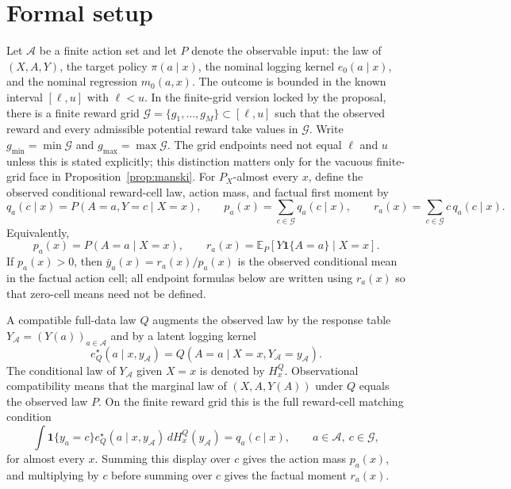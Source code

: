\documentclass[11pt]{article}
\newcommand{\E}{\mathbb{E}}
\newcommand{\one}{\mathbf{1}}
\theoremstyle{definition}
\theoremstyle{plain}
\theoremstyle{remark}
\begin{document}
\section{Formal setup}
Let $\mathcal A$ be a finite action set and let $P$ denote the observable input:
the law of $(X,A,Y)$, the target policy $\pi(a\mid x)$, the nominal logging
kernel $e_0(a\mid x)$, and the nominal regression $m_0(a,x)$.  The outcome is
bounded in the known interval $[\ell,u]$ with $\ell<u$.  In the finite-grid
version locked by the proposal, there is a finite reward grid
$\mathcal G=\{g_1,\ldots,g_M\}\subset[\ell,u]$ such that the observed reward and
every admissible potential reward take values in $\mathcal G$.  Write
$g_{\min}=\min\mathcal G$ and $g_{\max}=\max\mathcal G$.  The grid endpoints
need not equal $\ell$ and $u$ unless this is stated explicitly; this distinction
matters only for the vacuous finite-grid face in Proposition~\ref{prop:manski}.
For $P_X$-almost every $x$, define the observed conditional reward-cell law,
action mass, and factual first moment by
\[
  q_a(c\mid x)=P(A=a,Y=c\mid X=x),\qquad
  p_a(x)=\sum_{c\in\mathcal G}q_a(c\mid x),\qquad
  r_a(x)=\sum_{c\in\mathcal G}c\,q_a(c\mid x).
\]
Equivalently,
\[
  p_a(x)=P(A=a\mid X=x), \qquad
  r_a(x)=\E_P[Y\one\{A=a\}\mid X=x].
\]
If $p_a(x)>0$, then $\bar y_a(x)=r_a(x)/p_a(x)$ is the observed conditional
mean in the factual action cell; all endpoint formulas below are written using
$r_a(x)$ so that zero-cell means need not be defined.

A compatible full-data law $Q$ augments the observed law by the response table
$Y_{\mathcal A}=(Y(a))_{a\in\mathcal A}$ and by a latent logging kernel
\[
  e_Q^\star(a\mid x,y_{\mathcal A})
  =Q(A=a\mid X=x,Y_{\mathcal A}=y_{\mathcal A}).
\]
The conditional law of $Y_{\mathcal A}$ given $X=x$ is denoted by $H_x^Q$.
Observational compatibility means that the marginal law of $(X,A,Y(A))$ under
$Q$ equals the observed law $P$.  On the finite reward grid this is the full
reward-cell matching condition
\[
  \int \one\{y_a=c\}e_Q^\star(a\mid x,y_{\mathcal A})\,
      dH_x^Q(y_{\mathcal A})
  =q_a(c\mid x),
  \qquad a\in\mathcal A,\ c\in\mathcal G,
\]
for almost every $x$.  Summing this display over $c$ gives the action mass
$p_a(x)$, and multiplying by $c$ before summing over $c$ gives the factual
moment $r_a(x)$.
\end{document}
